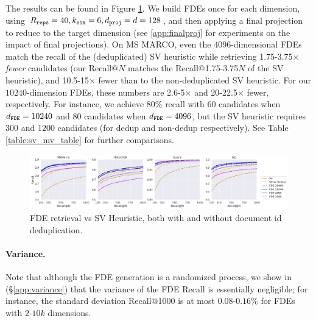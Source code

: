 The results can be found in Figure \ref{fig:sv_mv}. We build FDEs once for each dimension, using $R_{\texttt{reps}} = 40, k_{\texttt{sim}} = 6, d_{\texttt{proj}} = d = 128$, and then applying a final projection to reduce to the target dimension (see \ref{app:finalproj} for experiments on the impact of final projections).
On MS MARCO, even the $4096$-dimensional FDEs match the recall of the (deduplicated) SV heuristic while retrieving 1.75-3.75$\times$ \emph{fewer} candidates  (our Recall$@N$ matches the Recall$@$1.75-3.75$N$ of the SV heuristic), and 10.5-15$\times$ fewer than to the non-deduplicated SV heuristic. For our $10240$-dimension FDEs, these numbers are 2.6-5$\times$ and 20-22.5$\times$ fewer, respectively. For instance, we achieve $80\%$ recall with $60$ candidates when $d_{\texttt{FDE}} = 10240$ and $80$ candidates when $d_{\texttt{FDE}} = 4096$, but the SV heuristic requires $300$ and $1200$ candidates (for dedup and non-dedup respectively). See Table \ref{table:sv_mv_table} for further comparisons.



\begin{figure}[t]
    \centering
  \includegraphics[width=\linewidth]{plots/SV_vs_MV.png}
   \caption{\small FDE retrieval vs SV Heuristic, both with and without document id deduplication. }
         \label{fig:sv_mv} %
\end{figure}




\paragraph{Variance.}Note that although the FDE generation is a randomized process, we show in (§\ref{app:variance}) that the variance of the FDE Recall is essentially negligible; for instance, the standard deviation Recall$@$1000 is at most $0.08$-$0.16\%$ for FDEs with $2$-$10k$ dimensions.


